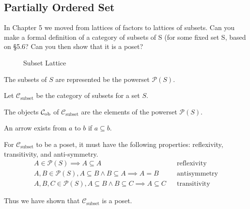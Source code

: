 \subsection{Partially Ordered Set}
\setcounter{tttacounter}{6}
\begin{ttta}
	In Chapter 5 we moved from lattices of factors to lattices of subsets.
	Can you make a formal definition of a category of subsets of S (for some fixed
	set S, based on \S 5.6? Can you then show that it is a poset?
\end{ttta}
\begin{figure}[H]
	\begin{center}
		
	\end{center}
	\caption{Subset Lattice}
\end{figure}
\begin{proofitem}
	\item The subsets of $S$ are represented be the powerset $\mathscr{P}(S)$.
	\item Let $\mathcal{C}_\text{subset}$ be the category of subsets for a set $S$.
	\item The objects $\mathcal{C}_{\text{ob}}{}$ of $\mathcal{C}_\text{subset}$ are the elements of
	the powerset $\mathscr{P}(S)$.
	\item An arrow exists from $a$ to $b$ if $a\subseteq b$.
	\item For $\mathcal{C}_\text{subset}$ to be a poset, it must have the following
	properties: reflexivity, transitivity, and anti-symmetry.
	\setcounter{equation}{0}
	\begin{align}
		A \in \mathscr{P}(S) \implies A\subseteq A                            &  & \text{reflexivity}  \\
		A,B \in \mathscr{P}(S), A\subseteq B \land B \subseteq A \implies A=B &  & \text{antisymmetry} \\
		A,B,C \in \mathscr{P}(S), A \subseteq B \land B \subseteq C \implies A
		\subseteq C                                                           &  & \text{transitivity}
	\end{align}
	\item Thus we have shown that $\mathcal{C}_\text{subset}$ is a poset.
\end{proofitem}
